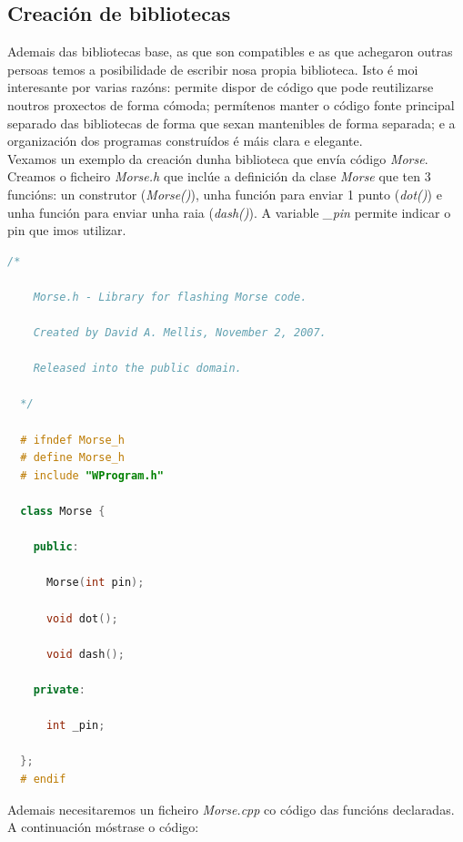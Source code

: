  \subsection{Creación de bibliotecas}

 Ademais das bibliotecas base, as que son compatibles e as que achegaron outras
 persoas temos a posibilidade de escribir nosa propia biblioteca. Isto é moi
 interesante por varias razóns: permite dispor de código que pode reutilizarse
 noutros proxectos de forma cómoda; permítenos manter o código fonte principal
 separado das bibliotecas de forma que sexan mantenibles de forma separada; e a
 organización dos programas construídos é máis clara e elegante. \\

 Vexamos un exemplo da creación dunha biblioteca que envía código
 \textit{Morse}. \\

 Creamos o ficheiro \textit{Morse.h} que inclúe a definición da clase
 \textit{Morse} que ten 3 funcións: un construtor (\textit{Morse()}), unha
 función para enviar 1 punto (\textit{dot()}) e unha función para enviar unha
 raia (\textit{dash()}). A variable \textit{\_pin} permite indicar o pin que
 imos utilizar. \\

 \begin{lstlisting}[language=C++,frame=single]
  /*
 
    Morse.h - Library for flashing Morse code.
 
    Created by David A. Mellis, November 2, 2007.
 
    Released into the public domain.
 
  */

  # ifndef Morse_h
  # define Morse_h
  # include "WProgram.h"
 
  class Morse {
 
    public:
 
      Morse(int pin);
 
      void dot();
 
      void dash();
 
    private:
 
      int _pin;
 
  };
  # endif
 \end{lstlisting}

 Ademais necesitaremos un ficheiro \textit{Morse.cpp} co código das funcións
 declaradas. A continuación móstrase o código: \\

